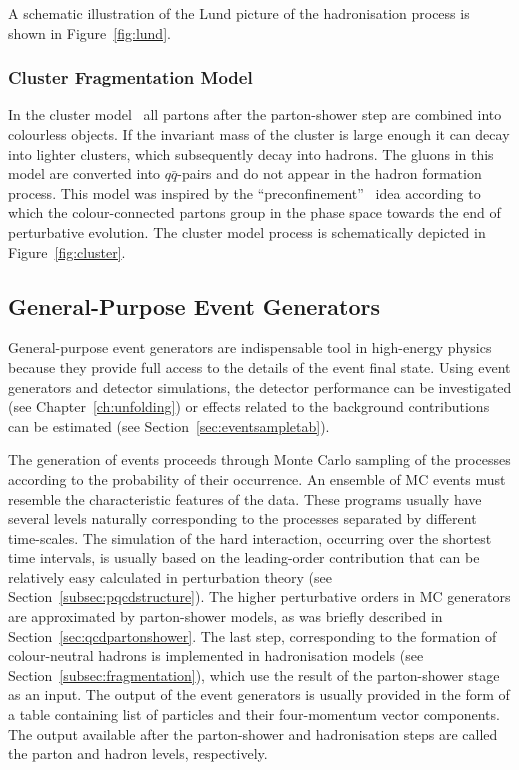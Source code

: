 A schematic illustration of the Lund picture of the hadronisation process is shown in Figure~\ref{fig:lund}.
\subsubsection{Cluster Fragmentation Model}
In the cluster model~\cite{Webber:1983if,Field:1982dg} all partons after the parton-shower step are combined into colourless objects. If the invariant mass of the cluster is large enough it can decay into lighter clusters, which subsequently decay into hadrons. The gluons in this model are converted into $q\bar{q}$-pairs and do not appear in the hadron formation process. This model was inspired by the ``preconfinement''~\cite{Amati:1979fg} idea according to which the colour-connected partons group in the phase space towards the end of perturbative evolution. The cluster model process is schematically depicted in Figure~\ref{fig:cluster}.

\subsection{General-Purpose Event Generators}
General-purpose event generators are indispensable tool in high-energy physics because they provide full access to the details of the event  final state. Using event generators and detector simulations, the detector performance can be investigated (see Chapter~\ref{ch:unfolding}) or effects related to the background contributions can be estimated (see Section~\ref{sec:eventsampletab}).

The generation of events proceeds through Monte Carlo sampling of the processes according to the probability of their occurrence. An ensemble of MC events must resemble the characteristic features of the data. These programs usually have several levels naturally corresponding to the processes separated by different time-scales. The simulation of the hard interaction, occurring over the shortest time intervals, is usually based on the leading-order contribution that can be relatively easy calculated in perturbation theory (see Section~\ref{subsec:pqcdstructure}). The higher perturbative orders in MC generators are approximated by parton-shower models, as was briefly described in Section~\ref{sec:qcdpartonshower}. The last step, corresponding to the formation of colour-neutral hadrons is implemented in hadronisation models (see Section~\ref{subsec:fragmentation}), which use the result of the parton-shower stage as an input. The output of the event generators is usually provided in the form of a table containing list of particles and their four-momentum vector components. The output available after the parton-shower and hadronisation steps are called the parton and hadron levels, respectively. 

